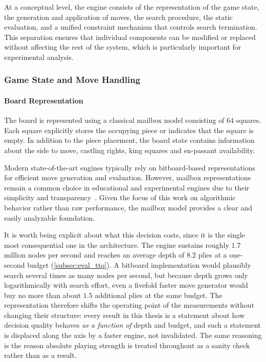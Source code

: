 At a conceptual level, the engine consists of the representation of the game
state, the generation and application of moves, the search procedure, the static
evaluation, and a unified constraint mechanism that controls search termination.
This separation ensures that individual components can be modified or replaced
without affecting the rest of the system, which is particularly important for
experimental analysis.

\subsubsection{Game State and Move Handling}

\paragraph{Board Representation}
The board is represented using a classical mailbox model consisting of 64
squares. Each square explicitly stores the occupying piece or indicates that the
square is empty. In addition to the piece placement, the board state contains
information about the side to move, castling rights, king squares and en-passant availability.

Modern state-of-the-art engines typically rely on bitboard-based representations
for efficient move generation and evaluation. However, mailbox representations
remain a common choice in educational and experimental engines due to their
simplicity and transparency~\cite{cpw_bitboards}. Given the focus of this work on
algorithmic behavior rather than raw performance, the mailbox model provides a
clear and easily analyzable foundation.

It is worth being explicit about what this decision costs, since it is the single
most consequential one in the architecture. The engine sustains roughly
$1.7$ million nodes per second and reaches an average depth of $8.2$ plies at a
one-second budget (\cref{subsec:eval_ttq}). A bitboard implementation would
plausibly search several times as many nodes per second, but because depth grows
only logarithmically with search effort, even a fivefold faster move generator
would buy no more than about $1.5$ additional plies at the same budget. The
representation therefore shifts the operating point of the measurements without
changing their structure: every result in this thesis is a statement about how
decision quality behaves \emph{as a function of} depth and budget, and such a
statement is displaced along the axis by a faster engine, not invalidated. The
same reasoning is the reason absolute playing strength is treated throughout as a
sanity check rather than as a result.

